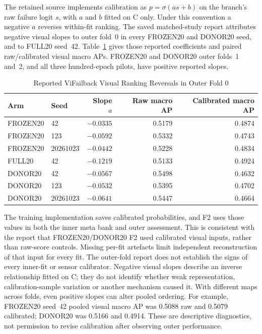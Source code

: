 The retained source implements calibration as $p=\sigma(a s+b)$ on the branch's raw
failure logit $s$, with $a$ and $b$ fitted on C only. Under this convention a negative
$a$ reverses within-fit ranking. The saved matched-study report attributes negative
visual slopes to outer fold~0 in every FROZEN20 and DONOR20 seed, and to FULL20
seed~42. Table~\ref{tab:vif-calibration} gives those reported coefficients and paired
raw/calibrated visual macro APs. FROZEN20 and DONOR20 outer folds~1 and~2, and all
three hundred-epoch pilots, have positive reported slopes.

\begin{table}[htbp]
\caption{Reported ViFailback Visual Ranking Reversals in Outer Fold 0}
\label{tab:vif-calibration}\centering\small
\begin{tabular}{llrrr}\toprule
Arm & Seed & Slope $a$ & Raw macro AP & Calibrated macro AP\\\midrule
FROZEN20 & 42 & $-0.0335$ & 0.5179 & 0.4874\\
FROZEN20 & 123 & $-0.0592$ & 0.5332 & 0.4743\\
FROZEN20 & 20261023 & $-0.0442$ & 0.5228 & 0.4834\\
FULL20 & 42 & $-0.1219$ & 0.5133 & 0.4924\\
DONOR20 & 42 & $-0.0567$ & 0.5498 & 0.4632\\
DONOR20 & 123 & $-0.0532$ & 0.5395 & 0.4702\\
DONOR20 & 20261023 & $-0.0641$ & 0.5447 & 0.4664\\
\bottomrule\end{tabular}
\end{table}

The training implementation saves calibrated probabilities, and F2
uses those values in both the inner meta bank and outer assessment. This is
consistent with the report that FROZEN20/DONOR20 F2 used calibrated visual inputs,
rather than raw-score controls. Missing per-fit artefacts limit independent
reconstruction of that input for every fit. The outer-fold report does not establish the signs of every
inner-fit or sensor calibrator. Negative visual slopes describe an inverse relationship
fitted on C; they do not identify whether weak representation, calibration-sample
variation or another mechanism caused it. With different maps across folds, even
positive slopes can alter pooled ordering. For example, FROZEN20 seed~42 pooled visual
macro AP was 0.5088 raw and 0.5079 calibrated; DONOR20 was 0.5166 and 0.4914.
These are descriptive diagnostics, not permission to revise calibration after observing
outer performance.

